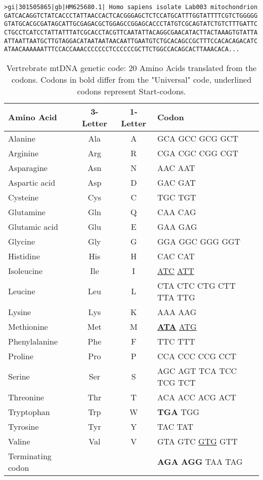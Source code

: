 {\small 
\begin{lstlisting}[caption= {Excerpt of an mtDNA fasta file, here the first 350 bases of 16,570}, label={lst:fasta}]
>gi|301505865|gb|HM625680.1| Homo sapiens isolate Lab003 mitochondrion
GATCACAGGTCTATCACCCTATTAACCACTCACGGGAGCTCTCCATGCATTTGGTATTTTCGTCTGGGGG
GTATGCACGCGATAGCATTGCGAGACGCTGGAGCCGGAGCACCCTATGTCGCAGTATCTGTCTTTGATTC
CTGCCTCATCCTATTATTTATCGCACCTACGTTCAATATTACAGGCGAACATACTTACTAAAGTGTATTA
ATTAATTAATGCTTGTAGGACATAATAATAACAATTGAATGTCTGCACAGCCGCTTTCCACACAGACATC
ATAACAAAAAATTTCCACCAAACCCCCCCTCCCCCCGCTTCTGGCCACAGCACTTAAACACA...
\end{lstlisting}
}
\begin{table}[ht]
\begin{tabular}{lccl}
\textbf{Amino Acid}&\textbf{3-Letter}&\textbf{1-Letter}&\textbf{Codon}\\ 
\hline
Alanine&Ala&A&GCA GCC GCG GCT \\ 
Arginine&Arg&R&CGA CGC CGG CGT \\ 
Asparagine&Asn&N&AAC AAT\\ 
Aspartic acid&Asp&D&GAC GAT \\ 
Cysteine&Cys&C&TGC TGT \\ 
Glutamine&Gln&Q&CAA CAG \\ 
Glutamic acid&Glu&E&GAA GAG \\ 
Glycine&Gly&G&GGA GGC GGG GGT \\ 
Histidine&His&H&CAC CAT \\ 
Isoleucine&Ile&I&\underline{ATC} \underline{ATT} \\ 
Leucine&Leu&L&CTA CTC CTG CTT TTA TTG\\ 
Lysine&Lys&K&AAA AAG \\ 
Methionine&Met&M&\textbf{\underline{ATA}} \underline{ATG}\\ 
Phenylalanine&Phe&F&TTC TTT \\ 
Proline&Pro&P&CCA CCC CCG CCT \\ 
Serine&Ser&S&AGC AGT TCA TCC TCG TCT\\ 
Threonine&Thr&T&ACA ACC ACG ACT \\ 
Tryptophan&Trp&W&\textbf{TGA} TGG \\ 
Tyrosine&Tyr&Y&TAC TAT \\ 
Valine&Val&V&GTA GTC \underline{GTG} GTT  \\ 
Terminating codon&&&\textbf{AGA} \textbf{AGG} TAA TAG \\ 
\end{tabular}
\caption[Vertrebrate mtDNA genetic code]{Vertrebrate mtDNA genetic code: 20 Amino Acids translated from the codons. Codons in bold differ from the "Universal" code, underlined codons represent Start-codons. }
\label{tbl:aac}
\end{table}
